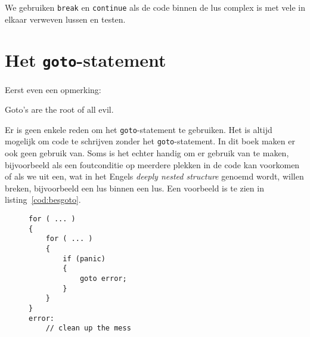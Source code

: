 
We gebruiken \texttt{break} en \texttt{continue} als de code binnen de lus complex is met vele in elkaar verweven lussen en testen.

\section{Het \texttt{goto}-statement}
Eerst even een opmerking:

\begin{displayquote}
Goto's are the root of all evil.
\end{displayquote}

Er is geen enkele reden om het \texttt{goto}-statement te gebruiken. Het is altijd mogelijk om code te schrijven zonder het \texttt{goto}-statement. In dit boek maken er ook geen gebruik van. Soms is het echter handig om er gebruik van te maken, bijvoorbeeld als een foutconditie op meerdere plekken in de code kan voorkomen of als we uit een, wat in het Engels \textsl{deeply nested structure} genoemd wordt, willen breken, bijvoorbeeld een lus binnen een lus. Een voorbeeld is te zien in listing~\ref{cod:besgoto}.


\begin{figure}[!ht]
\begin{lstlisting}[caption=Gebruik van het \texttt{goto}-statement.,label=cod:besgoto]
for ( ... )
{
    for ( ... )
    {
        if (panic)
        {
            goto error;
        }
    }   
}
error:
    // clean up the mess
\end{lstlisting}
\end{figure}